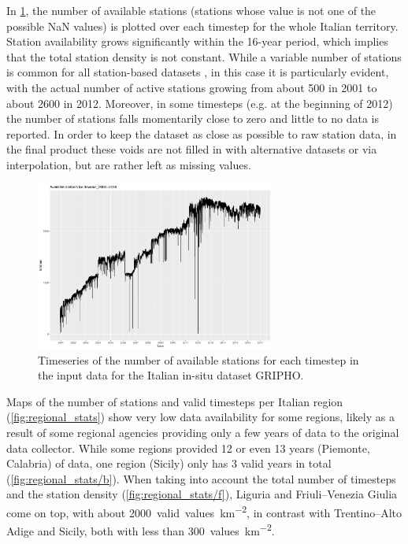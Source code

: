 In \cref{fig:stat_avail_ts}, the number of available stations (stations whose value is not one of the possible NaN values) is plotted over each timestep for the whole Italian territory. Station availability grows significantly within the 16-year period, which implies that the total station density is not constant. While a variable number of stations is common for all station-based datasets \citep[see for example][, figure 2]{Haylock2008}, in this case it is particularly evident, with the actual number of active stations growing from about 500 in 2001 to about 2600 in 2012. Moreover, in some timesteps (e.g. at the beginning of 2012) the number of stations falls momentarily close to zero and little to no data is reported. In order to keep the dataset as close as possible to raw station data, in the final product these voids are not filled in with alternative datasets or via interpolation, but are rather left as missing values.

\begin{figure}
    \centering
    \includegraphics[width=0.7\textwidth]{figures/rain_dst/station_count_line.png}
    \decoRule
    \caption[Count of available stations per timestep]{Timeseries of the number of available stations for each timestep in the input data for the Italian in-situ dataset GRIPHO.} \label{fig:stat_avail_ts}
\end{figure}

Maps of the number of stations and valid timesteps per Italian region (\cref{fig:regional_stats}) show very low data availability for some regions, likely as a result of some regional agencies providing only a few years of data to the original data collector. While some regions provided 12 or even 13 years (Piemonte, Calabria) of data, one region (Sicily) only has 3 valid years in total (\cref{fig:regional_stats/b}). When taking into account the total number of timesteps and the station density  (\cref{fig:regional_stats/f}), Liguria and Friuli--Venezia Giulia come on top, with about \SI{2000}{valid values\per\kilo\metre\squared}, in contrast with Trentino--Alto Adige and Sicily, both with less than \SI{300}{values\per\kilo\metre\squared}. 


